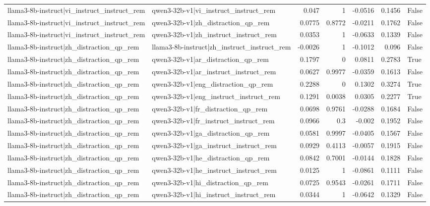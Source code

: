 \begin{table}
\begin{tabular}{l l r r r r l}
llama3-8b-instruct|vi_instruct_instruct_rem & qwen3-32b-v1|vi_instruct_instruct_rem & 0.047 & 1 & -0.0516 & 0.1456 & False \\
llama3-8b-instruct|vi_instruct_instruct_rem & qwen3-32b-v1|zh_distraction_qp_rem & 0.0775 & 0.8772 & -0.0211 & 0.1762 & False \\
llama3-8b-instruct|vi_instruct_instruct_rem & qwen3-32b-v1|zh_instruct_instruct_rem & 0.0353 & 1 & -0.0633 & 0.1339 & False \\
llama3-8b-instruct|zh_distraction_qp_rem & llama3-8b-instruct|zh_instruct_instruct_rem & -0.0026 & 1 & -0.1012 & 0.096 & False \\
llama3-8b-instruct|zh_distraction_qp_rem & qwen3-32b-v1|ar_distraction_qp_rem & 0.1797 & 0 & 0.0811 & 0.2783 & True \\
llama3-8b-instruct|zh_distraction_qp_rem & qwen3-32b-v1|ar_instruct_instruct_rem & 0.0627 & 0.9977 & -0.0359 & 0.1613 & False \\
llama3-8b-instruct|zh_distraction_qp_rem & qwen3-32b-v1|eng_distraction_qp_rem & 0.2288 & 0 & 0.1302 & 0.3274 & True \\
llama3-8b-instruct|zh_distraction_qp_rem & qwen3-32b-v1|eng_instruct_instruct_rem & 0.1291 & 0.0038 & 0.0305 & 0.2277 & True \\
llama3-8b-instruct|zh_distraction_qp_rem & qwen3-32b-v1|fr_distraction_qp_rem & 0.0698 & 0.9761 & -0.0288 & 0.1684 & False \\
llama3-8b-instruct|zh_distraction_qp_rem & qwen3-32b-v1|fr_instruct_instruct_rem & 0.0966 & 0.3 & -0.002 & 0.1952 & False \\
llama3-8b-instruct|zh_distraction_qp_rem & qwen3-32b-v1|ga_distraction_qp_rem & 0.0581 & 0.9997 & -0.0405 & 0.1567 & False \\
llama3-8b-instruct|zh_distraction_qp_rem & qwen3-32b-v1|ga_instruct_instruct_rem & 0.0929 & 0.4113 & -0.0057 & 0.1915 & False \\
llama3-8b-instruct|zh_distraction_qp_rem & qwen3-32b-v1|he_distraction_qp_rem & 0.0842 & 0.7001 & -0.0144 & 0.1828 & False \\
llama3-8b-instruct|zh_distraction_qp_rem & qwen3-32b-v1|he_instruct_instruct_rem & 0.0125 & 1 & -0.0861 & 0.1111 & False \\
llama3-8b-instruct|zh_distraction_qp_rem & qwen3-32b-v1|hi_distraction_qp_rem & 0.0725 & 0.9543 & -0.0261 & 0.1711 & False \\
llama3-8b-instruct|zh_distraction_qp_rem & qwen3-32b-v1|hi_instruct_instruct_rem & 0.0344 & 1 & -0.0642 & 0.1329 & False \\

\end{tabular}
\end{table}
